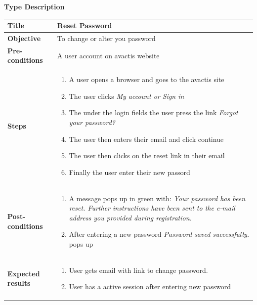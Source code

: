 \documentclass[UKenglish,12pt]{article}
\begin{document}
\begin{enumerate}
\newpage
\textbf{\hspace{0.3cm}Type\hspace{4.4cm} Description}
\newline \vspace{0.2cm}
\begin{tabular}{| p{5cm} | p{10cm} | }
	\hline
	 \textbf{Title} & Reset Password\\ \hline
	 \textbf{Objective} & To change or alter you password\\ \hline
	 \textbf{Pre-conditions} & A user account on avactis website\\ \hline
	 \textbf{Steps} & \begin{enumerate} \item A user opens a browser and goes to the avactis site \item The user clicks \textit{My account or Sign in} \item The under the login fields the user press the link \textit{Forgot your password?} \item The user then enters their email and click continue \item The user then clicks on the reset link in their email \item Finally the user enter their new passord \end{enumerate} \\ \hline
	 \textbf{Post-conditions} & \begin{enumerate} \item A message pops up in green with: \textit{Your password has been reset. Further instructions have been sent to the e-mail address you provided during registration.} \item After entering a new password \textit{Password saved successfully.} pops up \end{enumerate}\\ \hline
	 \textbf{Expected results} & \begin{enumerate} \item User gets email with link to change password. \item User has a active session after entering new password \end{enumerate} \\ 
	 \hline
\end{tabular} %


\end{enumerate}
\end{document}
